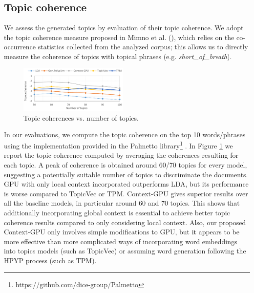 \documentclass[letterpaper]{article}
\begin{document}
\subsection{Topic coherence}
We assess the generated topics by evaluation of their topic coherence. %
We adopt the topic coherence measure proposed in Mimno et al. (\citeyear{Mimno11}), which relies on the co-occurrence statistics collected from the analyzed corpus; this allows us to directly measure the coherence of topics with topical phrases (e.g. \textit{short\_of\_breath}).

\begin{figure}[!ht]
  \centering
\includegraphics[width=0.48\textwidth]{model_coherences_croped.pdf}
\caption{Topic coherences vs. number of topics.}
\label{fig:coherences}
\end{figure}

In our evaluations, we compute the topic coherence on the top 10 words/phrases using the implementation provided in the Palmetto library\footnote{https://github.com/dice-group/Palmetto} \cite{Roder15}.
In Figure \ref{fig:coherences} we report the topic coherence computed by averaging the coherences resulting for each topic. %
A peak of coherence is obtained around 60/70 topics for every model, suggesting a potentially suitable number of topics to discriminate the documents. GPU with only local context incorporated outperforms LDA, but its performance is worse compared to TopicVec or TPM.
Context-GPU gives superior results over all the baseline models, in particular around 60 and 70 topics. This shows that additionally incorporating global context is essential to achieve better topic coherence results compared to only considering local context. Also, our proposed Context-GPU only involves simple modifications to GPU, but it appears to be more effective than more complicated ways of incorporating word embeddings into topics models (such as TopicVec) or assuming word generation following the HPYP process (such as TPM).
\end{document}
